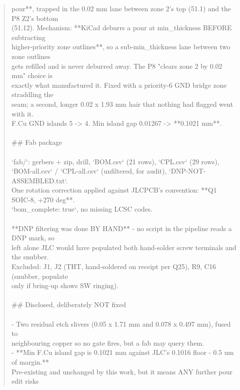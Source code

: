 \documentclass[11pt,a4paper]{article}
\begin{document}
\begin{quote}
pour{*}{*}, trapped in the 0.02 mm lane between zone 2's top (51.1) and the P8 Z2's bottom\\
(51.12). Mechanism: {*}{*}KiCad deburrs a pour at min\_thickness BEFORE subtracting\\
higher-priority zone outlines{*}{*}, so a sub-min\_thickness lane between two zone outlines\\
gets refilled and is never deburred away. The P8 "clears zone 2 by 0.02 mm" choice is\\
exactly what manufactured it. Fixed with a priority-6 GND bridge zone straddling the\\
seam; a second, longer 0.02 x 1.93 mm hair that nothing had flagged went with it.\\
F.Cu GND islands 5 -\textgreater{} 4. Min island gap 0.01267 -\textgreater{} {*}{*}0.1021 mm{*}{*}.\\
~\\
\#\# Fab package\\
~\\
`fab/`: gerbers + zip, drill, `BOM.csv` (21 rows), `CPL.csv` (29 rows),\\
`BOM-all.csv` / `CPL-all.csv` (unfiltered, for audit), `DNP-NOT-ASSEMBLED.txt`.\\
One rotation correction applied against JLCPCB's convention: {*}{*}Q1 SOIC-8, +270 deg{*}{*}.\\
`bom\_complete: true`, no missing LCSC codes.\\
~\\
{*}{*}DNP filtering was done BY HAND{*}{*} - no script in the pipeline reads a DNP mark, so\\
left alone JLC would have populated both hand-solder screw terminals and the snubber.\\
Excluded: J1, J2 (THT, hand-soldered on receipt per Q25), R9, C16 (snubber, populate\\
only if bring-up shows SW ringing).\\
~\\
\#\# Disclosed, deliberately NOT fixed\\
~\\
- Two residual etch slivers (0.05 x 1.71 mm and 0.078 x 0.497 mm), fused to\\
  neighbouring copper so no gate fires, but a fab may query them.\\
- {*}{*}Min F.Cu island gap is 0.1021 mm against JLC's 0.1016 floor - 0.5 um of margin.{*}{*}\\
  Pre-existing and unchanged by this work, but it means ANY further pour edit risks\\

\end{quote}
\end{document}
